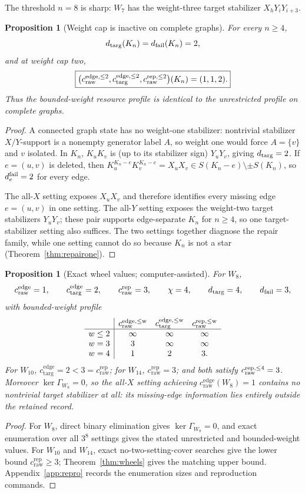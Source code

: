 \documentclass[11pt]{article}
\newtheorem{proposition}[theorem]{Proposition}
\theoremstyle{remark}
\newcommand{\cdiag}{c_{\mathrm{targ}}^{\mathrm{edge}}}
\newcommand{\ccutraw}{c_{\mathrm{raw}}^{\mathrm{edge}}}
\newcommand{\crep}{c_{\mathrm{raw}}^{\mathrm{rep}}}
\begin{document}
The threshold $n=8$ is sharp: $W_7$ has the weight-three target stabilizer $X_hY_iY_{i+3}$.

\begin{proposition}[Weight cap is inactive on complete graphs]\label{prop:Knweight}
For every $n\ge4$,
\[
d_{\rm targ}(K_n)=d_{\rm fail}(K_n)=2,
\]
and at weight cap two,
\[
\boxed{
\big(c_{\rm raw}^{\rm edge,\le2},c_{\rm targ}^{\rm edge,\le2},c_{\rm raw}^{\rm rep,\le2}\big)(K_n)=(1,1,2).}
\]
Thus the bounded-weight resource profile is identical to the unrestricted profile on complete graphs.
\end{proposition}
\begin{proof}
A connected graph state has no weight-one stabilizer: nontrivial stabilizer $X/Y$-support is a nonempty generator label $A$, so weight one would force $A=\{v\}$ and $v$ isolated. In $K_n$, $K_uK_v$ is (up to its stabilizer sign) $Y_uY_v$, giving $d_{\rm targ}=2$. If $e=(u,v)$ is deleted, then $K_u^{K_n-e}K_v^{K_n-e}=X_uX_v\in S(K_n-e)\setminus\pm S(K_n)$, so $d_e^{\rm fail}=2$ for every edge.

The all-$X$ setting exposes $X_uX_v$ and therefore identifies every missing edge $e=(u,v)$ in one setting. The all-$Y$ setting exposes the weight-two target stabilizers $Y_uY_v$; these pair supports edge-separate $K_n$ for $n\ge4$, so one target-stabilizer setting also suffices. The two settings together diagnose the repair family, while one setting cannot do so because $K_n$ is not a star (Theorem~\ref{thm:repairone}).
\end{proof}

\begin{proposition}[Exact wheel values; computer-assisted]\label{prop:wheelexact}
For $W_8$,
\[
\ccutraw=1,\qquad \cdiag=2,\qquad \crep=3,\qquad \chi=4,
\qquad d_{\rm targ}=4,\qquad d_{\rm fail}=3,
\]
with bounded-weight profile
\[
\begin{array}{c|ccc}
&c_{\rm raw}^{\rm edge,\le w}&c_{\rm targ}^{\rm edge,\le w}&c_{\rm raw}^{\rm rep,\le w}\\ \hline
w\le2&\infty&\infty&\infty\\
w=3&3&\infty&\infty\\
w=4&1&2&3.
\end{array}
\]
For $W_{10}$, $\cdiag=2<3=\crep$; for $W_{14}$, $\crep=3$; and both satisfy
$c_{\rm raw}^{\rm rep,\le4}=3$. Moreover $\ker\Gamma_{W_8}=0$, so the all-$X$ setting
achieving $\ccutraw(W_8)=1$ contains no nontrivial target stabilizer at all: its missing-edge
information lies entirely outside the retained record.
\end{proposition}
\begin{proof}
For $W_8$, direct binary elimination gives $\ker\Gamma_{W_8}=0$, and exact enumeration over all $3^8$ settings gives the stated unrestricted and bounded-weight values.  For $W_{10}$ and $W_{14}$, exact no-two-setting-cover searches give the lower bound $\crep\ge3$; Theorem~\ref{thm:wheels} gives the matching upper bound.  Appendix~\ref{app:repro} records the enumeration sizes and reproduction commands.
\end{proof}
\end{document}
